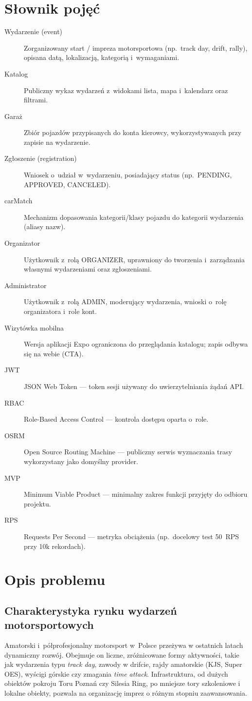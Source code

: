 \documentclass{sprz}
\begin{document}
\chapter{Słownik pojęć}  
\begin{description}  
 \item[Wydarzenie (event)] Zorganizowany start / impreza motorsportowa (np.\ track day, drift, rally), opisana datą, lokalizacją, kategorią i~wymaganiami.  
 \item[Katalog] Publiczny wykaz wydarzeń z~widokami lista, mapa i~kalendarz oraz filtrami.  
 \item[Garaż] Zbiór pojazdów przypisanych do konta kierowcy, wykorzystywanych przy zapisie na wydarzenie.  
 \item[Zgłoszenie (registration)] Wniosek o~udział w~wydarzeniu, posiadający status (np.\ PENDING, APPROVED, CANCELED).  
 \item[carMatch] Mechanizm dopasowania kategorii/klasy pojazdu do kategorii wydarzenia (aliasy nazw).  
 \item[Organizator] Użytkownik z~rolą ORGANIZER, uprawniony do tworzenia i~zarządzania własnymi wydarzeniami oraz zgłoszeniami.  
 \item[Administrator] Użytkownik z~rolą ADMIN, moderujący wydarzenia, wnioski o~rolę organizatora i~role kont.  
 \item[Wizytówka mobilna] Wersja aplikacji Expo ograniczona do przeglądania katalogu; zapis odbywa się na webie (CTA).  
 \item[JWT] JSON Web Token --- token sesji używany do uwierzytelniania żądań API.  
 \item[RBAC] Role-Based Access Control --- kontrola dostępu oparta o~role.  
 \item[OSRM] Open Source Routing Machine --- publiczny serwis wyznaczania trasy wykorzystany jako domyślny provider.  
 \item[MVP] Minimum Viable Product --- minimalny zakres funkcji przyjęty do odbioru projektu.  
 \item[RPS] Requests Per Second --- metryka obciążenia (np.\ docelowy test 50~RPS przy 10k rekordach).  
\end{description}  
  
\chapter{Opis problemu}  

\section{Charakterystyka rynku wydarzeń motorsportowych}  
Amatorski i~półprofesjonalny motorsport w~Polsce przeżywa w ostatnich latach dynamiczny rozwój. Obejmuje on liczne, zróżnicowane formy aktywności, takie jak wydarzenia typu \emph{track day}, zawody w drifcie, rajdy amatorskie (KJS, Super OES), wyścigi górskie czy zmagania \emph{time attack}. Infrastruktura, od dużych obiektów pokroju Toru Poznań czy Silesia Ring, po mniejsze tory szkoleniowe i lokalne obiekty, pozwala na organizację imprez o różnym stopniu zaawansowania. 
\end{document}
